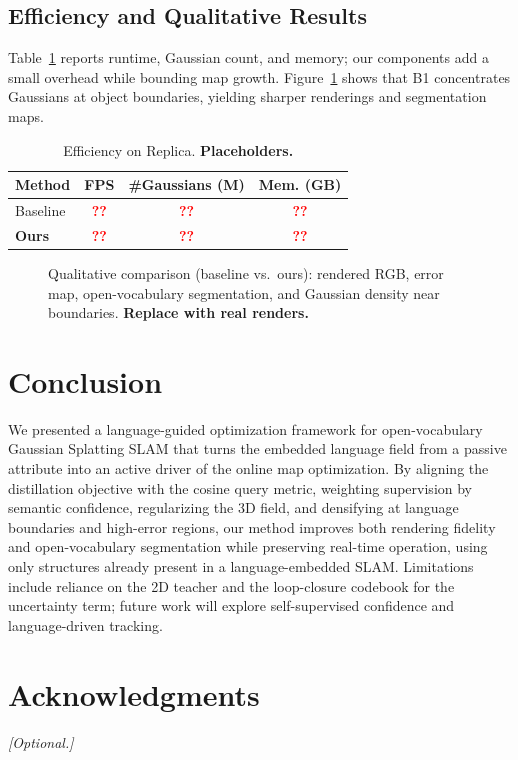 \documentclass[10pt, journal]{IEEEtran}
\newcommand{\tofill}{\textcolor{red}{\textbf{??}}}
\begin{document}
\subsection{Efficiency and Qualitative Results}
Table~\ref{tab:eff} reports runtime, Gaussian count, and memory; our components add
a small overhead while bounding map growth. Figure~\ref{fig:qual} shows that B1
concentrates Gaussians at object boundaries, yielding sharper renderings and
segmentation maps.

\begin{table}[t]
\centering
\caption{Efficiency on Replica. \textbf{Placeholders.}}
\label{tab:eff}
\begin{tabular}{lccc}
\toprule
Method & FPS & \#Gaussians (M) & Mem. (GB) \\
\midrule
Baseline      & \tofill & \tofill & \tofill \\
\textbf{Ours} & \tofill & \tofill & \tofill \\
\bottomrule
\end{tabular}
\end{table}

\begin{figure}[t]
  \centering
  \caption{Qualitative comparison (baseline vs.\ ours): rendered RGB, error map,
  open-vocabulary segmentation, and Gaussian density near boundaries.
  \textbf{Replace with real renders.}}
  \label{fig:qual}
\end{figure}

\section{Conclusion}\label{sec:conclusion}
We presented a language-guided optimization framework for open-vocabulary Gaussian
Splatting SLAM that turns the embedded language field from a passive attribute into
an active driver of the online map optimization. By aligning the distillation
objective with the cosine query metric, weighting supervision by semantic
confidence, regularizing the 3D field, and densifying at language boundaries and
high-error regions, our method improves both rendering fidelity and
open-vocabulary segmentation while preserving real-time operation, using only
structures already present in a language-embedded SLAM. Limitations include
reliance on the 2D teacher and the loop-closure codebook for the uncertainty term;
future work will explore self-supervised confidence and language-driven tracking.

\section*{Acknowledgments}
\emph{[Optional.]}



\end{document}
